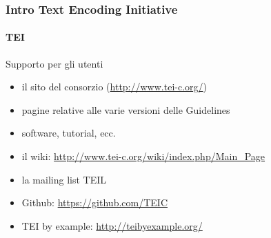 \begin{frame}
	\frametitle{Intro Text Encoding Initiative}
	\framesubtitle{TEI}
	\addtocounter{nframe}{1}

	\begin{block}{Supporto per gli utenti}
		\begin{itemize}
			\item il sito del consorzio (\url{http://www.tei-c.org/})
			\item pagine relative alle varie versioni delle Guidelines
			\item software, tutorial, ecc.
			\item il wiki: \url{http://www.tei-c.org/wiki/index.php/Main_Page}
			\item la mailing list TEI\-L
			\item Github: \url{https://github.com/TEIC}
			\item TEI by example: \url{http://teibyexample.org/}
		\end{itemize}
	\end{block}
\end{frame}








